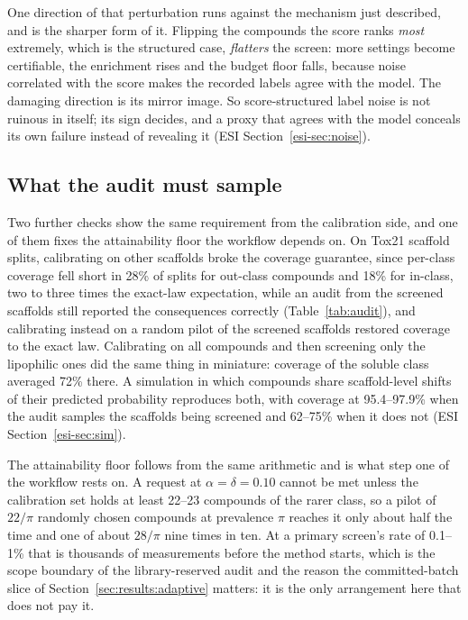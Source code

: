 \documentclass[twocolumn,10pt]{article}
\begin{document}
One direction of that perturbation runs against the mechanism just described, and is the sharper
form of it. Flipping the compounds the score ranks \emph{most} extremely, which is the structured case, \emph{flatters} the screen: more settings become certifiable, the enrichment rises and the
budget floor falls, because noise correlated with the score makes the recorded labels agree with
the model. The damaging direction is its mirror image. So score-structured label noise is not
ruinous in itself; its sign decides, and a proxy that agrees with the model conceals its own failure instead of revealing it (ESI Section~\ref{esi-sec:noise}).

\subsection{What the audit must sample}
\label{sec:results:dependence}

Two further checks show the same requirement from the calibration side, and one of them fixes
the attainability floor the workflow depends on. On Tox21 scaffold splits, calibrating on other
scaffolds broke the coverage guarantee, since per-class coverage fell short in 28\% of splits for
out-class compounds and 18\% for in-class, two to three times the exact-law expectation, while an audit from the screened scaffolds still reported the consequences correctly
(Table~\ref{tab:audit}), and calibrating instead on a random pilot of the screened scaffolds
restored coverage to the exact law. Calibrating on all compounds and then screening only the
lipophilic ones did the same thing in miniature: coverage of the soluble class averaged 72\%
there. A simulation in which compounds share scaffold-level shifts of their predicted probability
reproduces both, with coverage at 95.4--97.9\% when the audit samples the scaffolds being screened
and 62--75\% when it does not (ESI Section~\ref{esi-sec:sim}).

The attainability floor follows from the same arithmetic and is what step one of the workflow
rests on. A request at $\alpha=\delta=0.10$ cannot be met unless the calibration set holds at
least 22--23 compounds of the rarer class, so a pilot of $22/\pi$ randomly chosen compounds at
prevalence $\pi$ reaches it only about half the time and one of about $28/\pi$ nine times in ten.
At a primary screen's rate of 0.1--1\% that is thousands of measurements before the method
starts, which is the scope boundary of the library-reserved audit and the reason the
committed-batch slice of Section~\ref{sec:results:adaptive} matters: it is the only arrangement
here that does not pay it.
\end{document}
